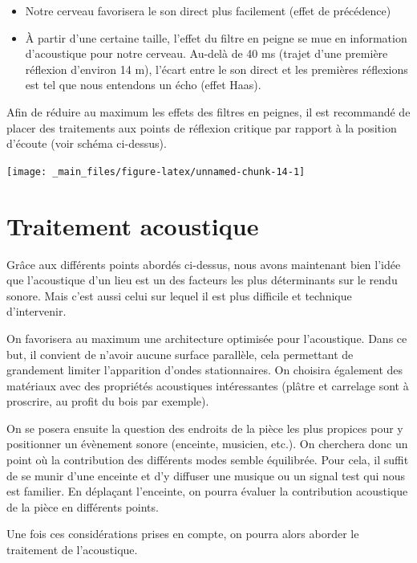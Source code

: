 \documentclass[
]{book}
\providecommand{\tightlist}{%
  \setlength{\itemsep}{0pt}\setlength{\parskip}{0pt}}
\begin{document}
\begin{itemize}
\tightlist
\item
  Notre cerveau favorisera le son direct plus facilement (effet de précédence)
\item
  À partir d'une certaine taille, l'effet du filtre en peigne se mue en information d'acoustique pour notre cerveau. Au-delà de 40 ms (trajet d'une première réflexion d'environ 14 m), l'écart entre le son direct et les premières réflexions est tel que nous entendons un écho (effet Haas).
\end{itemize}

Afin de réduire au maximum les effets des filtres en peignes, il est recommandé de placer des traitements aux points de réflexion critique par rapport à la position d'écoute (voir schéma ci-dessus).

\begin{center}\texttt{[image: \_main\_files/figure-latex/unnamed-chunk-14-1]} \end{center}

\hypertarget{traitement-acoustique}{%
\section{Traitement acoustique}\label{traitement-acoustique}}

Grâce aux différents points abordés ci-dessus, nous avons maintenant bien l'idée que l'acoustique d'un lieu est un des facteurs les plus déterminants sur le rendu sonore. Mais c'est aussi celui sur lequel il est plus difficile et technique d'intervenir.

On favorisera au maximum une architecture optimisée pour l'acoustique. Dans ce but, il convient de n'avoir aucune surface parallèle, cela permettant de grandement limiter l'apparition d'ondes stationnaires. On choisira également des matériaux avec des propriétés acoustiques intéressantes (plâtre et carrelage sont à proscrire, au profit du bois par exemple).

On se posera ensuite la question des endroits de la pièce les plus propices pour y positionner un évènement sonore (enceinte, musicien, etc.). On cherchera donc un point où la contribution des différents modes semble équilibrée. Pour cela, il suffit de se munir d'une enceinte et d'y diffuser une musique ou un signal test qui nous est familier. En déplaçant l'enceinte, on pourra évaluer la contribution acoustique de la pièce en différents points.

Une fois ces considérations prises en compte, on pourra alors aborder le traitement de l'acoustique.
\end{document}
